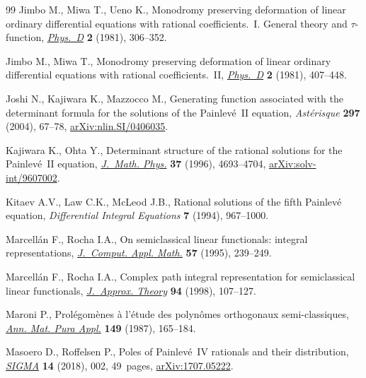 \documentclass[10pt,a4paper]{amsart}
\numberwithin{equation}{section}
\theoremstyle{definition}
\begin{document}
\begin{thebibliography}{99}
Jimbo M., Miwa T., Ueno K., Monodromy preserving deformation of linear ordinary
 differential equations with rational coefficients.~{I}. {G}eneral theory and
 {$\tau $}-function,
 \href{https://doi.org/10.1016/0167-2789(81)90013-0}{\textit{Phys.~D}}
 \textbf{2} (1981), 306--352.

Jimbo M., Miwa T., Monodromy preserving deformation of linear ordinary
 differential equations with rational coefficients.~{II},
 \href{https://doi.org/10.1016/0167-2789(81)90021-X}{\textit{Phys.~D}}
 \textbf{2} (1981), 407--448.

Joshi N., Kajiwara K., Mazzocco M., Generating function associated with the
 determinant formula for the solutions of the {P}ainlev\'e~{II} equation,
 \textit{Ast\'erisque} \textbf{297} (2004), 67--78,
 \href{http://arxiv.org/abs/nlin.SI/0406035}{arXiv:nlin.SI/0406035}.

Kajiwara K., Ohta Y., Determinant structure of the rational solutions for the
 {P}ainlev\'e~{II} equation,
 \href{https://doi.org/10.1063/1.531648}{\textit{J.~Math. Phys.}} \textbf{37}
 (1996), 4693--4704,
 \href{http://arxiv.org/abs/solv-int/9607002}{arXiv:solv-int/9607002}.

Kitaev A.V., Law C.K., McLeod J.B., Rational solutions of the fifth
 {P}ainlev\'e equation, \textit{Differential Integral Equations} \textbf{7}
 (1994), 967--1000.

Marcell\'an F., Rocha I.A., On semiclassical linear functionals: integral
 representations,
 \href{https://doi.org/10.1016/0377-0427(93)E0248-K}{\textit{J.~Comput. Appl.
 Math.}} \textbf{57} (1995), 239--249.

Marcell\'an F., Rocha I.A., Complex path integral representation for
 semiclassical linear functionals,
 \href{https://doi.org/10.1006/jath.1998.3190}{\textit{J.~Approx. Theory}}
 \textbf{94} (1998), 107--127.

Maroni P., Prol\'egom\`enes \`a l'\'etude des polyn\^{o}mes orthogonaux
 semi-classiques, \href{https://doi.org/10.1007/BF01773932}{\textit{Ann. Mat.
 Pura Appl.}} \textbf{149} (1987), 165--184.

Masoero D., Roffelsen P., Poles of {P}ainlev\'e~{IV} rationals and their
 distribution, \href{https://doi.org/10.3842/SIGMA.2018.002}{\textit{SIGMA}}
 \textbf{14} (2018), 002, 49~pages,
 \href{http://arxiv.org/abs/1707.05222}{arXiv:1707.05222}.


\end{thebibliography}
\end{document}
